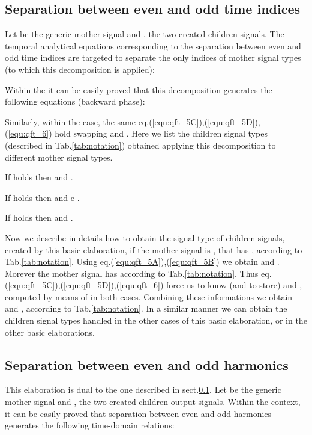\documentclass[a4paper,10pt]{article}
\begin{document}
\subsection{Separation between even and odd time indices}  \label{sec:separe_n}



Let  be the generic mother signal and ,  the two created children signals.
The temporal analytical equations corresponding to the separation between even and odd time indices are targeted to separate the only  indices of mother signal types (to which this decomposition is applied):


Within the  it can be easily proved that this decomposition generates the following equations (backward phase):



Similarly, within the  case, the same eq.(\ref{equ:qft_5C}),(\ref{equ:qft_5D}),(\ref{equ:qft_6}) hold swapping  and .
Here we list the children signal types (described in Tab.\ref{tab:notation}) obtained applying this decomposition to different mother signal types.

If  holds then  and .

If  holds then  and e .

If  holds then  and .

Now we describe in details how to obtain the signal type of children signals, created by this basic elaboration, if the mother signal is , that has , according to Tab.\ref{tab:notation}.
Using eq.(\ref{equ:qft_5A}),(\ref{equ:qft_5B}) we obtain  and .
Morever the mother signal has  according to Tab.\ref{tab:notation}. 
Thus eq.(\ref{equ:qft_5C}),(\ref{equ:qft_5D}),(\ref{equ:qft_6}) force us to know (and to store)  and , computed by means of  in both cases.
Combining these informations we obtain  and , according to Tab.\ref{tab:notation}.
In a similar manner we can obtain the children signal types handled in the other cases of this basic elaboration, or in the other basic elaborations. 




\subsection{Separation between even and odd harmonics} \label{sec:separe_k}

This elaboration is dual to the one described in sect.\ref{sec:separe_n}.
Let  be the generic mother signal and ,  the two created children output signals.
Within the  context, it can be easily proved that separation between even and odd harmonics generates the following time-domain relations:
\end{document}
